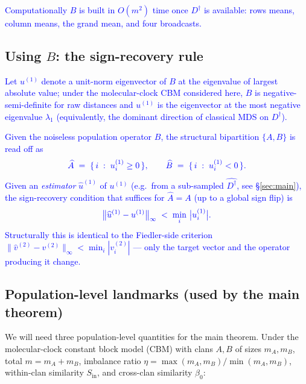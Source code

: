 \documentclass[11pt]{article}
\newcommand{\new}[1]{\textcolor{blue}{#1}}
\newcommand{\newmath}[1]{{\color{blue} #1}}
\theoremstyle{remark}
\newcommand{\1}{\mathbf{1}}
\newcommand{\Ddist}{D^{\dagger}}      %
\newcommand{\hatD}{\widehat{\Ddist}}  %
\newcommand{\hatu}{\widehat{u}}
\newcommand{\Bop}{B}
\begin{document}
\new{Computationally $\Bop$ is built in $O(m^{2})$ time once $\Ddist$ is
available: rows means, column means, the grand mean, and four broadcasts.}

\subsection{Using \texorpdfstring{$\Bop$}{B}: the sign-recovery rule}
\label{sec:using}

\new{Let $u^{(1)}$ denote a unit-norm eigenvector of $\Bop$ at the
eigenvalue of largest absolute value; under the molecular-clock CBM
considered here, $\Bop$ is negative-semi-definite for raw distances and
$u^{(1)}$ is the eigenvector at the most negative eigenvalue $\lambda_{1}$
(equivalently, the dominant direction of classical MDS on $\Ddist$).}

\new{Given the noiseless population operator $\Bop$, the structural
bipartition $\{A, B\}$ is read off as}
\begin{equation}
\newmath{
  \widehat{A} \;=\; \{\, i \;:\; u^{(1)}_{i} \ge 0 \,\}, \qquad
  \widehat{B} \;=\; \{\, i \;:\; u^{(1)}_{i}  <  0 \,\}.
}
\label{eq:sign-rule}
\end{equation}
\new{Given an \emph{estimator} $\hatu^{(1)}$ of $u^{(1)}$ (e.g.\ from a
sub-sampled $\hatD$, see \S\ref{sec:main}), the sign-recovery condition
that suffices for $\widehat{A} = A$ (up to a global sign flip) is}
\begin{equation}
\newmath{
  \big\| \hatu^{(1)} - u^{(1)} \big\|_{\infty}
  \;<\;
  \min_{i}\, \big| u^{(1)}_{i} \big|.
}
\label{eq:sign-criterion}
\end{equation}
\new{Structurally this is identical to the Fiedler-side criterion
$\|\widehat v^{(2)} - v^{(2)}\|_{\infty} < \min_{i}|v^{(2)}_{i}|$ --- only
the target vector and the operator producing it change.}

\subsection{Population-level landmarks (used by the main theorem)}
\label{sec:landmarks}

We will need three population-level quantities for the main theorem.
Under the molecular-clock constant block model (CBM) with clans $A, B$ of
sizes $m_{A}, m_{B}$, total $m = m_{A} + m_{B}$, imbalance ratio $\eta =
\max(m_{A}, m_{B}) / \min(m_{A}, m_{B})$, within-clan similarity
$S_{\mathrm{in}}$, and cross-clan similarity $\beta_{0}$:
\end{document}
